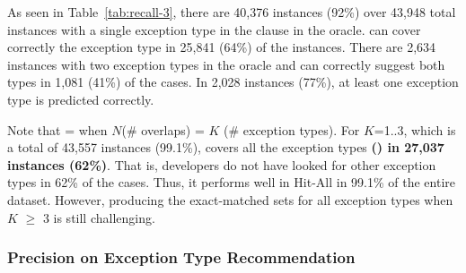 

As seen in Table~\ref{tab:recall-3}, there are 40,376 instances (92\%)
over 43,948 total instances with a single exception type in the
 clause in the oracle. {\tool} can cover correctly the
exception type in 25,841 (64\%) of the instances. There are 2,634
instances with two exception types in the oracle and {\tool} can
correctly suggest both types in 1,081 (41\%) of the cases. In 2,028
instances (77\%), at least one exception type is predicted correctly.

Note that  =  when $N$(\# overlaps) = $K$
(\# exception types). For $K$=1..3, which is a total of 43,557
instances (99.1\%), {\tool} covers all the exception types {\bf
  () in 27,037 instances (62\%)}. That is, developers do
not have looked for other exception types in 62\% of the
cases. Thus, it performs well in Hit-All in 99.1\% of the entire
dataset. However, producing the exact-matched sets for all exception
types when $K$ $\geq$ 3 is still challenging.


\subsubsection{{\bf Precision on Exception Type Recommendation}}
\label{sec:req3-precision}


